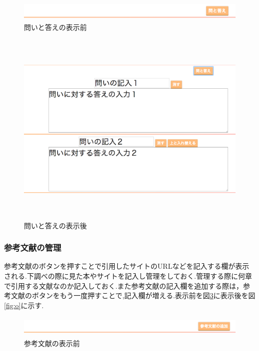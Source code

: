 \documentclass[a4j,12pt]{jarticle}
\begin{document}
\begin{figure}[h]
\begin{center}
 \includegraphics[clip,width=150mm,height=10mm]{04qanda.png}
\end{center}
 \caption{問いと答えの表示前}
 \label{fig:l}
\end{figure}

\begin{figure}[h]
\begin{center}
 \includegraphics[clip,width=150mm,height=95mm]{05qanda.png}
\end{center}
 \caption{問いと答えの表示後}
 \label{fig:m}
\end{figure}
\newpage

\subsubsection{参考文献の管理}
参考文献のボタンを押すことで引用したサイトのURLなどを記入する欄が表示される.下調べの際に見た本やサイトを記入し管理をしておく.管理する際に何章で引用する文献なのか記入しておく.また参考文献の記入欄を追加する際は，参考文献のボタンをもう一度押すことで,記入欄が増える.表示前を図\ref{fig:n}に表示後を図\ref{fig:o}に示す.

\begin{figure}[h]
\begin{center}
 \includegraphics[clip,width=150mm,height=10mm]{06sankou.png}
\end{center}
 \caption{参考文献の表示前}
 \label{fig:n}
\end{figure}
\end{document}
